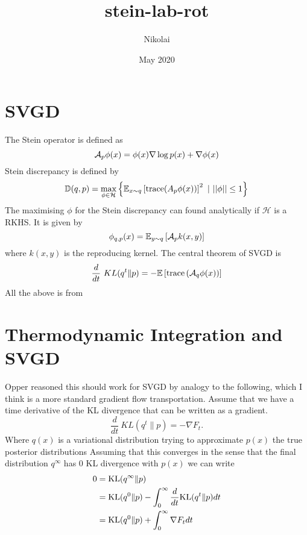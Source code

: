 \documentclass{article}
\title{stein-lab-rot}
\author{Nikolai }
\date{May 2020}
\begin{document}
\maketitle

\section{SVGD}
The Stein operator is defined as
\begin{equation}
    \label{eq:stein_operator}
    \mathcal{A}_p \phi(x) = \phi(x) \nabla \log p(x) + \nabla \phi(x)
\end{equation}
Stein discrepancy is defined by
\begin{equation}
    \label{eq:stein_discrepancy}
    \mathbb{D}( q, p ) = \max_{ \phi \in \mathcal{H} } 
    \left\{ 
        \mathbb{E}_{ x \sim q } 
        \left[ 
            \textrm{trace} ( A_p \phi(x) ) 
        \right]^2
        \ | \ ||\phi|| \leq 1 
    \right\}
\end{equation}
The maximising $\phi$ for the Stein discrepancy can found analytically if $\mathcal{H}$ is a RKHS. It is given by
\begin{equation}
    \label{eq:phi_max}
    \phi_{ q, p } (x) = \mathbb{E}_{ y \sim q } \left[ \mathcal{A}_p k(x, y) \right]
\end{equation}
where $k(x,y)$ is the reproducing kernel.
The central theorem of SVGD is
\begin{equation}
    \label{eq:svgd}
    \frac{d}{dt}\ KL( q^t \| p ) = - \mathbb{E} \left[ \textrm{trace} \left( \mathcal{A}_q \phi(x) \right) \right]
\end{equation}
All the above is from \cite{svgd}


\section{Thermodynamic Integration and SVGD}
Opper reasoned this should work for SVGD by analogy to the following, which I think is a more standard gradient
flow transportation. Assume that we have a time derivative of the KL divergence that can be written as a gradient.
\begin{equation}
    \frac{d}{dt}\ KL( q^t \| p ) = - \nabla F_t.
\end{equation}
Where $q(x)$ is a variational distribution trying to approximate $p(x)$ the true posterior distributions
Assuming that this converges in the sense that the final distribution $q^{\infty}$ has 0 KL divergence with 
$p(x)$ we can write
\begin{align}
\label{eq:therm_int}
0 &= \textrm{KL}( q^{\infty} \| p ) \\
&= \textrm{KL}( q^0 \| p ) - \int_0^{\infty} \frac{d}{dt} \textrm{KL}( q^t \| p ) dt \\
&= \textrm{KL}( q^0 \| p ) + \int_0^{\infty} \nabla F_t dt
\end{align}
\end{document}
